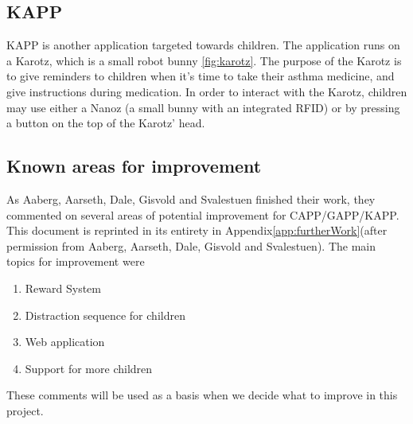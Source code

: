 

\subsection{KAPP}
KAPP is another application targeted towards children. The application runs on a Karotz\cite{karotz}, which is a small robot bunny \ref{fig:karotz}. The purpose of the Karotz is to give reminders to children when it's time to take their asthma medicine, and give instructions during medication. In order to interact with the Karotz, children may use either a Nanoz (a small bunny with an integrated RFID) or by pressing a button on the top of the Karotz' head.    



\subsection{Known areas for improvement}
\label{sec:improvements}
As Aaberg, Aarseth, Dale, Gisvold and Svalestuen finished their work, they commented on several areas of potential improvement for CAPP/GAPP/KAPP. This document is reprinted in its entirety in Appendix\ref{app:furtherWork}(after permission from Aaberg, Aarseth, Dale, Gisvold and Svalestuen). The main topics for improvement were
\begin{enumerate}
\item{Reward System}
\item{Distraction sequence for children}
\item{Web application}
\item{Support for more children}
\end{enumerate}

These comments will be used as a basis when we decide what to improve in this project.




